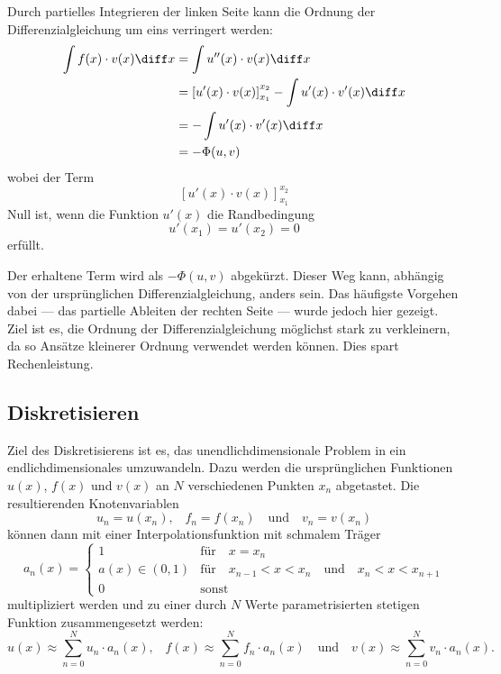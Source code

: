 Durch partielles Integrieren der linken Seite kann die Ordnung der Differenzialgleichung um eins verringert werden:
\begin{align}
    \int f(x) \cdot v(x) \diff x &= \int u''(x) \cdot v(x) \diff x \\
                                 &= \left[ u'(x) \cdot v(x) \right]_{x_1}^{x_2} - \int u'(x) \cdot v'(x) \diff x \\
                                 &= - \int u'(x) \cdot v'(x) \diff x \\
                                 &= - \Phi(u, v)
\end{align}
wobei der Term
\begin{equation}
    \left[ u'(x) \cdot v(x) \right]_{x_1}^{x_2}
\end{equation}
Null ist, wenn die Funktion $u'(x)$ die Randbedingung
\begin{equation}
    u'(x_1) = u'(x_2) = 0
\end{equation}
erfüllt. 

Der erhaltene Term wird als $-\Phi(u, v)$ abgekürzt.
Dieser Weg kann, abhängig von der ursprünglichen Differenzialgleichung, anders sein.
Das häufigste Vorgehen dabei --- das partielle Ableiten der rechten Seite --- wurde jedoch hier gezeigt.
Ziel ist es, die Ordnung der Differenzialgleichung möglichst stark zu verkleinern, da so Ansätze kleinerer Ordnung verwendet werden können.
Dies spart Rechenleistung.


\subsection{Diskretisieren\label{fem:1d:diskretisieren}}
Ziel des Diskretisierens ist es, das unendlichdimensionale Problem in ein endlichdimensionales umzuwandeln.
Dazu werden die ursprünglichen Funktionen $u(x)$, $f(x)$ und $v(x)$ an $N$ verschiedenen Punkten $x_n$ abgetastet.
Die resultierenden Knotenvariablen
\begin{equation}
    u_n = u(x_n) 
    \text{,} \quad
    f_n = f(x_n)
    \quad \text{und} \quad
    v_n = v(x_n)
\end{equation}
können dann mit einer Interpolationsfunktion mit schmalem Träger
\begin{equation}
    a_n(x) = \left\{ \begin{array}{ll}
        1
            & \text{für} \quad x = x_n \\
        a(x) \in (0, 1) 
            & \text{für} \quad x_{n-1} < x < x_n \quad \text{und} \quad x_n < x < x_{n+1} \\
        0
            & \text{sonst} 
    \end{array} \right.
\end{equation}
multipliziert werden und zu einer durch $N$ Werte parametrisierten stetigen Funktion zusammengesetzt werden:
\begin{equation}
    u(x) \approx \sum_{n=0}^{N}{u_n \cdot a_n(x)} 
    \text{,} \quad
    f(x) \approx \sum_{n=0}^{N}{f_n \cdot a_n(x)} 
    \quad \text{und} \quad
    v(x) \approx \sum_{n=0}^{N}{v_n \cdot a_n(x)}.
\end{equation}

